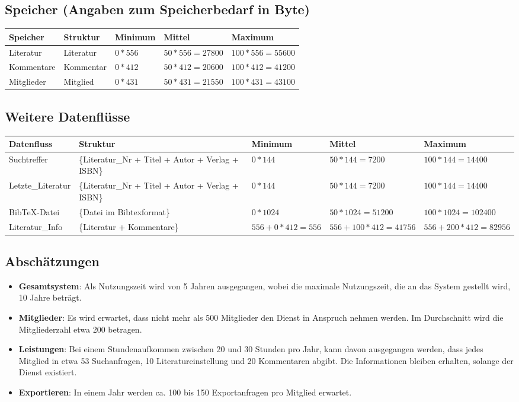\subsection{Speicher (Angaben zum Speicherbedarf in Byte)}
\begin{tabular}[ht]{|l|l|l|l|l|}
\hline
Speicher & Struktur & Minimum & Mittel & Maximum \\
\hline\hline
Literatur & {Literatur} & $0*556$ & $50*556=27800$ & $100*556=55600$ \\
Kommentare & {Kommentar} & $0*412$ & $50*412=20600$ & $100*412=41200$ \\
Mitglieder & {Mitglied}  & $0*431$ & $50*431=21550$ & $100*431=43100$ \\
\hline
\end{tabular}

\subsection{Weitere Datenflüsse}
\begin{tabular}[ht]{|l|p{4cm}|p{2cm}|p{2cm}|p{2cm}|}
\hline
Datenfluss & Struktur & Minimum & Mittel & Maximum \\
\hline\hline

Suchtreffer & \{Literatur\_Nr + Titel + Autor + Verlag + ISBN\}  & $0*144$ & $50*144=7200$ & $100*144=14400$ \\
Letzte\_Literatur & \{Literatur\_Nr + Titel + Autor + Verlag + ISBN\}  & $0*144$ & $50*144=7200$ & $100*144=14400$ \\
BibTeX-Datei & \{Datei im Bibtexformat\} & $0*1024$ & $50*1024=51200$ & $100*1024=102400$ \\
Literatur\_Info & \{Literatur + Kommentare\} & $556 + 0*412=556$ & $556 + 100*412=41756$ & $556 + 200*412=82956$ \\
\hline
\end{tabular}

\subsection{Abschätzungen}
\begin{itemize}
 \item \textbf{Gesamtsystem}: Als Nutzungszeit wird von 5 Jahren ausgegangen, wobei die maximale Nutzungszeit, 
die an das System gestellt wird, 10 Jahre betr\"agt.
 \item \textbf{Mitglieder}: Es wird erwartet, dass nicht mehr als 500 Mitglieder den Dienst in Anspruch nehmen werden. Im Durchschnitt wird
 die Mitgliederzahl etwa 200 betragen.
\item \textbf{Leistungen}: Bei einem Stundenaufkommen zwischen 20 und 30 Stunden pro Jahr, kann davon ausgegangen werden, dass jedes 
Mitglied in etwa 53 Suchanfragen, 10 Literatureinstellung und 20 Kommentaren abgibt. Die Informationen bleiben erhalten, solange der Dienst existiert.  
\item \textbf{Exportieren}: In einem Jahr werden ca. 100 bis 150 Exportanfragen pro Mitglied erwartet.
\end{itemize}

